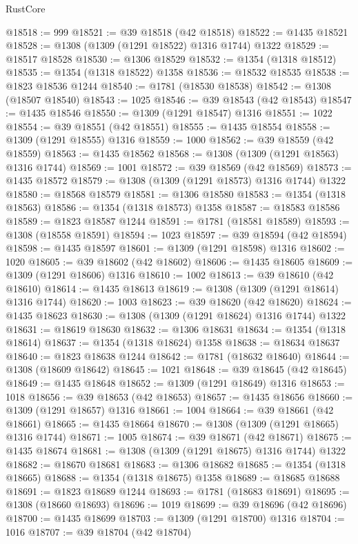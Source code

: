 \begin{lexlean}{RustCore}
\begin{coremodule}
@18518 := 999
@18521 := @39 @18518 (@42 @18518)
@18522 := @1435 @18521
@18528 := @1308 (@1309 (@1291 @18522) @1316 @1744) @1322
@18529 := @18517 @18528
@18530 := @1306 @18529
@18532 := @1354 (@1318 @18512)
@18535 := @1354 (@1318 @18522) @1358
@18536 := @18532 @18535
@18538 := @1823 @18536 @1244
@18540 := @1781 (@18530 @18538)
@18542 := @1308 (@18507 @18540)
@18543 := 1025
@18546 := @39 @18543 (@42 @18543)
@18547 := @1435 @18546
@18550 := @1309 (@1291 @18547) @1316
@18551 := 1022
@18554 := @39 @18551 (@42 @18551)
@18555 := @1435 @18554
@18558 := @1309 (@1291 @18555) @1316
@18559 := 1000
@18562 := @39 @18559 (@42 @18559)
@18563 := @1435 @18562
@18568 := @1308 (@1309 (@1291 @18563) @1316 @1744)
@18569 := 1001
@18572 := @39 @18569 (@42 @18569)
@18573 := @1435 @18572
@18579 := @1308 (@1309 (@1291 @18573) @1316 @1744) @1322
@18580 := @18568 @18579
@18581 := @1306 @18580
@18583 := @1354 (@1318 @18563)
@18586 := @1354 (@1318 @18573) @1358
@18587 := @18583 @18586
@18589 := @1823 @18587 @1244
@18591 := @1781 (@18581 @18589)
@18593 := @1308 (@18558 @18591)
@18594 := 1023
@18597 := @39 @18594 (@42 @18594)
@18598 := @1435 @18597
@18601 := @1309 (@1291 @18598) @1316
@18602 := 1020
@18605 := @39 @18602 (@42 @18602)
@18606 := @1435 @18605
@18609 := @1309 (@1291 @18606) @1316
@18610 := 1002
@18613 := @39 @18610 (@42 @18610)
@18614 := @1435 @18613
@18619 := @1308 (@1309 (@1291 @18614) @1316 @1744)
@18620 := 1003
@18623 := @39 @18620 (@42 @18620)
@18624 := @1435 @18623
@18630 := @1308 (@1309 (@1291 @18624) @1316 @1744) @1322
@18631 := @18619 @18630
@18632 := @1306 @18631
@18634 := @1354 (@1318 @18614)
@18637 := @1354 (@1318 @18624) @1358
@18638 := @18634 @18637
@18640 := @1823 @18638 @1244
@18642 := @1781 (@18632 @18640)
@18644 := @1308 (@18609 @18642)
@18645 := 1021
@18648 := @39 @18645 (@42 @18645)
@18649 := @1435 @18648
@18652 := @1309 (@1291 @18649) @1316
@18653 := 1018
@18656 := @39 @18653 (@42 @18653)
@18657 := @1435 @18656
@18660 := @1309 (@1291 @18657) @1316
@18661 := 1004
@18664 := @39 @18661 (@42 @18661)
@18665 := @1435 @18664
@18670 := @1308 (@1309 (@1291 @18665) @1316 @1744)
@18671 := 1005
@18674 := @39 @18671 (@42 @18671)
@18675 := @1435 @18674
@18681 := @1308 (@1309 (@1291 @18675) @1316 @1744) @1322
@18682 := @18670 @18681
@18683 := @1306 @18682
@18685 := @1354 (@1318 @18665)
@18688 := @1354 (@1318 @18675) @1358
@18689 := @18685 @18688
@18691 := @1823 @18689 @1244
@18693 := @1781 (@18683 @18691)
@18695 := @1308 (@18660 @18693)
@18696 := 1019
@18699 := @39 @18696 (@42 @18696)
@18700 := @1435 @18699
@18703 := @1309 (@1291 @18700) @1316
@18704 := 1016
@18707 := @39 @18704 (@42 @18704)

\end{coremodule}
\end{lexlean}
